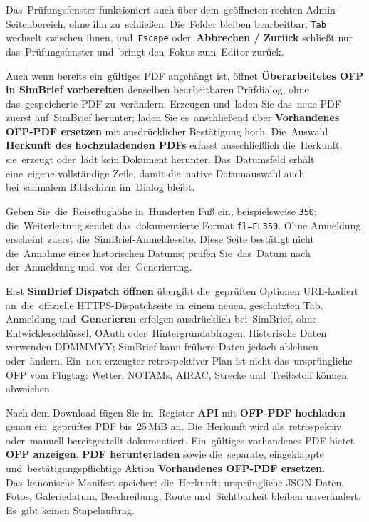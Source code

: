 \documentclass[11pt,a4paper]{article}
\newcommand{\ui}[1]{\textbf{#1}}
\newcommand{\codeword}[1]{\nolinkurl{#1}}
\begin{document}
Das~Prüfungsfenster funktioniert auch über dem~geöffneten rechten
Admin-Seitenbereich, ohne ihn zu~schließen. Die~Felder bleiben bearbeitbar,
\codeword{Tab} wechselt zwischen ihnen, und~\codeword{Escape} oder~\ui{Abbrechen
/ Zurück} schließt nur das~Prüfungsfenster und~bringt den~Fokus zum~Editor
zurück.

Auch wenn bereits ein~gültiges PDF angehängt ist, öffnet \ui{Überarbeitetes OFP
in SimBrief vorbereiten} denselben bearbeitbaren Prüfdialog, ohne
das~gespeicherte PDF zu~verändern. Erzeugen und~laden Sie das~neue PDF zuerst
auf~SimBrief herunter; laden Sie es~anschließend über \ui{Vorhandenes OFP-PDF
ersetzen} mit ausdrücklicher Bestätigung hoch. Die~Auswahl \ui{Herkunft des
hochzuladenden PDFs} erfasst ausschließlich die~Herkunft; sie~erzeugt oder~lädt
kein Dokument herunter. Das~Datumsfeld erhält eine~eigene vollständige Zeile,
damit die~native Datumauswahl auch bei~schmalem Bildschirm im~Dialog bleibt.

Geben Sie~die~Reiseflughöhe in~Hunderten Fuß ein, beispielsweise \codeword{350};
die~Weiterleitung sendet das~dokumentierte Format \codeword{fl=FL350}. Ohne
Anmeldung erscheint zuerst die~SimBrief-Anmeldeseite. Diese Seite bestätigt
nicht die~Annahme eines historischen Datums; prüfen Sie~das~Datum nach
der~Anmeldung und~vor der~Generierung.

Erst \ui{SimBrief Dispatch öffnen} übergibt die~geprüften Optionen URL-kodiert
an~die~offizielle HTTPS-Dispatchseite in~einem neuen, geschützten Tab. Anmeldung
und~\ui{Generieren} erfolgen ausdrücklich bei~SimBrief, ohne
Entwicklerschlüssel, OAuth oder~Hintergrundabfragen. Historische Daten verwenden
DDMMMYY; SimBrief kann frühere Daten jedoch ablehnen oder~ändern. Ein~neu
erzeugter retrospektiver Plan ist nicht das~ursprüngliche OFP vom Flugtag:
Wetter, NOTAMs, AIRAC, Strecke und~Treibstoff können abweichen.

Nach dem Download fügen Sie im~Register \ui{API} mit \ui{OFP-PDF hochladen}
genau ein~geprüftes PDF bis~25\,MiB an. Die~Herkunft wird als~retrospektiv
oder~manuell bereitgestellt dokumentiert. Ein~gültiges vorhandenes PDF bietet
\ui{OFP anzeigen}, \ui{PDF herunterladen} sowie die~separate, eingeklappte
und~bestätigungspflichtige Aktion \ui{Vorhandenes OFP-PDF ersetzen}.
Das~kanonische Manifest speichert die~Herkunft; ursprüngliche JSON-Daten, Fotos,
Galeriedatum, Beschreibung, Route und~Sichtbarkeit bleiben unverändert. Es~gibt
keinen Stapelauftrag.
\end{document}
